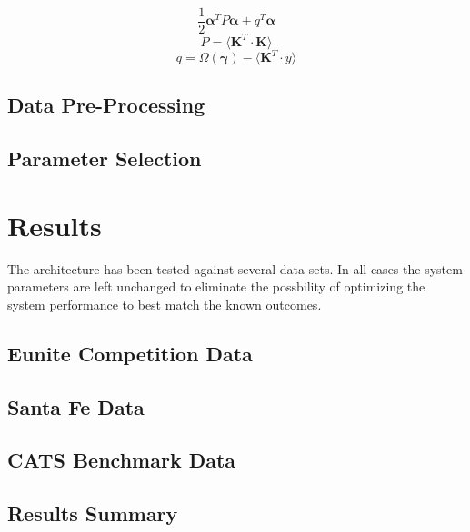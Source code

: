 \documentclass[10pt]{article}
\begin{document}
\[ \frac{1}{2} \boldsymbol{\alpha}^T P \boldsymbol{\alpha} + q^T \boldsymbol{\alpha} \]
\[ P = \langle \mathbf{K}^T \cdot \mathbf{K} \rangle \]
\[ q = \Omega( \boldsymbol{\gamma} ) - \langle \mathbf{K}^T \cdot y \rangle \]

\subsection{Data Pre-Processing}




\subsection{Parameter Selection}


\section{Results}
The architecture has been tested against several data sets.  In all cases the system parameters are left unchanged to eliminate the possbility of optimizing the system performance to best match the known outcomes.

\subsection{Eunite Competition Data}


\subsection{Santa Fe Data}


\subsection{CATS Benchmark Data}


\subsection{Results Summary}
\end{document}
